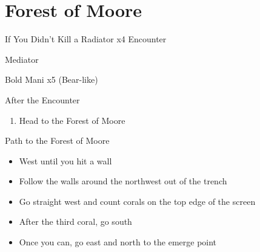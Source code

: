\chapter{Forest of Moore}

\vspace{\baselineskip}

\begin{paracol}{2}

\switchcolumn
\begin{steproute}{If You Didn't Kill a Radiator x4 Encounter}
    \begin{itemMenu}
        \hiPotionMenu {}
    \end{itemMenu}
    \begin{abilityMenu}
        \bartz \ability{!\gilToss} \optimize
    \end{abilityMenu}
    \begin{jobMenu}
        \lenna Mediator \textbf{\pointUp}
    \end{jobMenu}
\end{steproute}

\begin{steproute}{Bold Mani x5 (Bear-like)}
    \varwb
	\begin{notes}
		\item {}
	\end{notes}
	\begin{round}{1}
        \bartz \rightCommand{\gilToss}
    \end{round}
    \varwe
\end{steproute}

\begin{steproute}{After the Encounter}
    \begin{abilityMenu}
        \bartz \ability{!\escape} \optimize
    \end{abilityMenu}
\end{steproute}

\switchcolumn
\begin{enumerate}
    \item Head to the Forest of Moore
\end{enumerate}

\begin{misc}{Path to the Forest of Moore}
    \begin{itemize}
        \item West until you hit a wall
        \item Follow the walls around the northwest out of the trench
        \item Go straight west and count corals on the top edge of the screen
        \item After the third coral, go south
        \item Once you can, go east and north to the emerge point
    \end{itemize}
\end{misc}


\end{paracol}
